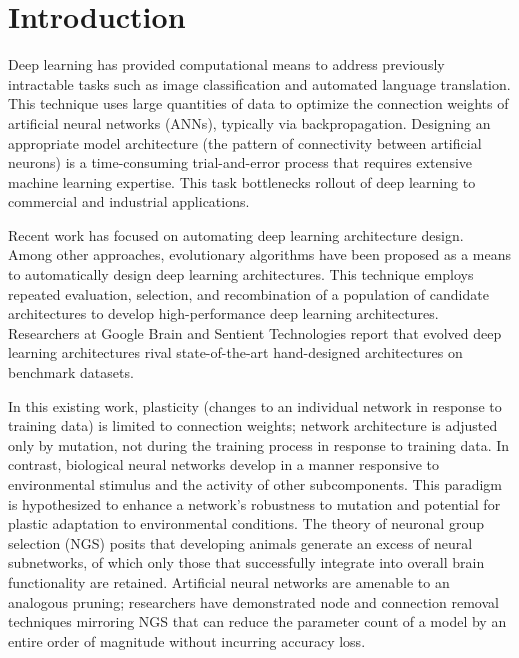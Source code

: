 \section{Introduction}

Deep learning has provided computational means to address previously intractable tasks such as image classification and automated language translation.
This technique uses large quantities of data to optimize the connection weights of artificial neural networks (ANNs), typically via backpropagation.
Designing an appropriate model architecture (the pattern of connectivity between artificial neurons) is a time-consuming trial-and-error process that requires extensive machine learning expertise.
This task bottlenecks rollout of deep learning to commercial and industrial applications.

Recent work has focused on automating deep learning architecture design.
Among other approaches, evolutionary algorithms have been proposed as a means to automatically design deep learning architectures.
This technique employs repeated evaluation, selection, and recombination of a population of candidate architectures to develop high-performance deep learning architectures.
Researchers at Google Brain\autocite{real2017large} and Sentient Technologies\autocite{miikkulainen2017evolving} report that evolved deep learning architectures rival state-of-the-art hand-designed architectures on benchmark datasets.

In this existing work, plasticity (changes to an individual network in response to training data) is limited to connection weights;
network architecture is adjusted only by mutation, not during the training process in response to training data.
In contrast, biological neural networks develop in a manner responsive to environmental stimulus and the activity of other subcomponents.
This paradigm is hypothesized to enhance a network's robustness to mutation and potential for plastic adaptation to environmental conditions.\autocite{downing2015intelligence}
The theory of neuronal group selection (NGS) posits that developing animals generate an excess of neural subnetworks, of which only those that successfully integrate into overall brain functionality are retained.\autocite{sanes2011development}
Artificial neural networks are amenable to an analogous pruning;
researchers have demonstrated node and connection removal techniques mirroring NGS that can reduce the parameter count of a model by an entire order of magnitude without incurring accuracy loss.\autocite{song2015learning}

